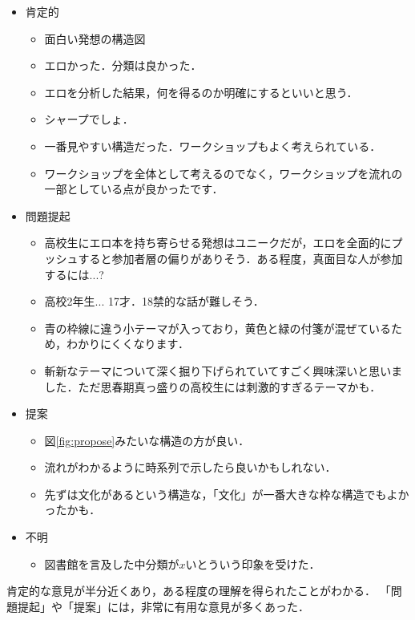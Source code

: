 \documentclass[pdflatex,ja=standard]{bxjsarticle}
\begin{document}
\begin{itemize}
    \item 肯定的
    \begin{itemize}
        \item 面白い発想の構造図
        \item エロかった．分類は良かった．
        \item エロを分析した結果，何を得るのか明確にするといいと思う．
        \item シャープでしょ．
        \item 一番見やすい構造だった．ワークショップもよく考えられている．
        \item ワークショップを全体として考えるのでなく，ワークショップを流れの一部としている点が良かったです．
    \end{itemize}
    \item 問題提起
    \begin{itemize}
        \item 高校生にエロ本を持ち寄らせる発想はユニークだが，エロを全面的にプッシュすると参加者層の偏りがありそう．ある程度，真面目な人が参加するには...?
        \item 高校2年生... 17才．18禁的な話が難しそう．
        \item 青の枠線に違う小テーマが入っており，黄色と緑の付箋が混ぜているため，わかりにくくなります．
        \item 斬新なテーマについて深く掘り下げられていてすごく興味深いと思いました．ただ思春期真っ盛りの高校生には刺激的すぎるテーマかも．
    \end{itemize}
    \item 提案
    \begin{itemize}
        \item 図\ref{fig:propose}みたいな構造の方が良い．
        \item 流れがわかるように時系列で示したら良いかもしれない．
        \item 先ずは文化があるという構造な，「文化」が一番大きな枠な構造でもよかったかも．
    \end{itemize}
    \item 不明
    \begin{itemize}
        \item 図書館を言及した中分類が$x$いとういう印象を受けた．
    \end{itemize}
\end{itemize}

肯定的な意見が半分近くあり，ある程度の理解を得られたことがわかる．
「問題提起」や「提案」には，非常に有用な意見が多くあった．
\end{document}
